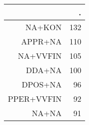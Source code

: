 \begin{tabular}{rr}
  \hline
 & . \\ 
  \hline
NA+KON & 132 \\ 
  APPR+NA & 110 \\ 
  NA+VVFIN & 105 \\ 
  DDA+NA & 100 \\ 
  DPOS+NA &  96 \\ 
  PPER+VVFIN &  92 \\ 
  NA+NA &  91 \\ 
   \hline
\end{tabular}
